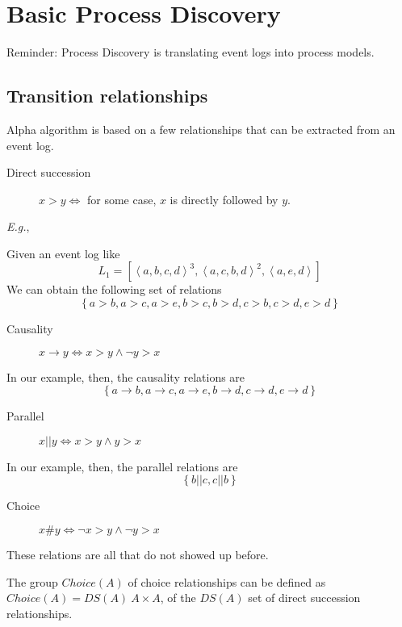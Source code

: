 
\section*{Basic Process Discovery}

Reminder: Process Discovery is translating event logs into process models.

\subsection*{Transition relationships}

Alpha algorithm is based on a few relationships that can be extracted from an event log.

\begin{description}
    \item[Direct succession] $x > y \iff$ for some case, $x$ is directly followed by $y$.
\end{description}

\emph{E.g.},

Given an event log like
\[
L_1=\left[ \left<a,b,c,d \right>^3, \left<a,c,b,d \right>^2, \left<a,e,d \right> \right] 
\] 
We can obtain the following set of relations
\[
\left\{ a>b,a>c,a>e,b>c,b>d,c>b,c>d,e>d  \right\}
\] 

\begin{description}
    \item[Causality] $x\to y \iff x>y \land \neg y>x$
\end{description}

In our example, then, the causality relations are
\[
\left\{ a\to b, a\to c, a\to e, b\to d, c\to d, e\to d \right\} 
\] 

\begin{description}
    \item[Parallel] $x||y \iff x>y \land y>x$
\end{description}

In our example, then, the parallel relations are
\[
\left\{ b||c, c||b \right\} 
\] 

\begin{description}
    \item[Choice] $x\#y \iff \neg x>y \land \neg y>x$
\end{description}

These relations are all that do not showed up before.

\begin{remark}
    The group $Choice(A)$ of choice relationships can be defined as  $Choice(A) = DS(A) \ A\times
    A$, of the $DS(A)$ set of direct succession relationships.
\end{remark}

